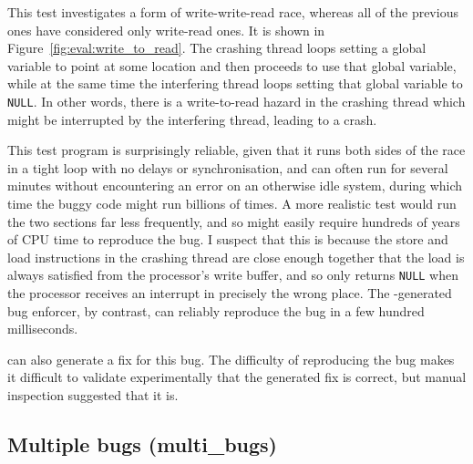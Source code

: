 This test investigates a form of write-write-read race, whereas all of
the previous ones have considered only write-read ones.  It is shown
in Figure~\ref{fig:eval:write_to_read}.  The crashing thread loops
setting a global variable to point at some location and then proceeds
to use that global variable, while at the same time the interfering
thread loops setting that global variable to \texttt{NULL}.  In other
words, there is a write-to-read hazard in the crashing thread which
might be interrupted by the interfering thread, leading to a crash.

This test program is surprisingly reliable, given that it runs both
sides of the race in a tight loop with no delays or synchronisation,
and can often run for several minutes without encountering an error on
an otherwise idle system, during which time the buggy code might run
billions of times.  A more realistic test would run the two sections
far less frequently, and so might easily require hundreds of years of
CPU time to reproduce the bug.  I suspect that this is because the
store and load instructions in the crashing thread are close enough
together that the load is always satisfied from the processor's write
buffer, and so only returns \texttt{NULL} when the processor receives
an interrupt in precisely the wrong place.    The {\technique}-generated bug enforcer, by contrast, can
reliably reproduce the bug in a few hundred milliseconds.

{\Technique} can also generate a fix for this bug.  The difficulty of
reproducing the bug makes it difficult to validate experimentally that
the generated fix is correct, but manual inspection suggested that it
is.

\subsection{Multiple bugs (multi\_bugs)}

